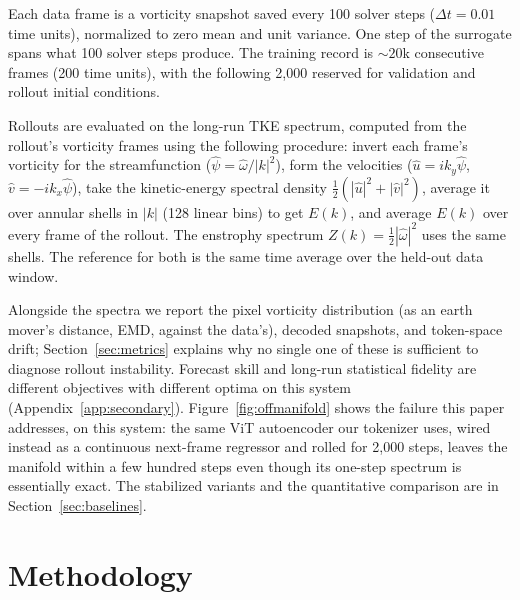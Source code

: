 \documentclass{article}
\begin{document}
Each data frame is a vorticity snapshot saved every 100 solver steps ($\Delta t = 0.01$ time units), normalized to zero mean and unit variance. One step
of the surrogate spans what 100 solver steps produce. The training record is ${\sim}20$k consecutive frames (200 time units), with the following 2{,}000 reserved for validation
and rollout initial conditions.


Rollouts are evaluated on the long-run TKE spectrum, computed from the rollout's vorticity frames using the following procedure: invert each frame's vorticity for the streamfunction
($\hat{\psi} = \hat{\omega}/|k|^2$), form the velocities
($\hat{u} = i k_y \hat{\psi}$, $\hat{v} = -i k_x \hat{\psi}$), take the
kinetic-energy spectral density $\tfrac{1}{2}(|\hat{u}|^2 + |\hat{v}|^2)$, average it
over annular shells in $|k|$ (128 linear bins) to get $E(k)$, and average $E(k)$
over every frame of the rollout. The enstrophy spectrum
$Z(k) = \tfrac{1}{2}|\hat{\omega}|^2$ uses the same shells. The reference for both is the
same time average over the held-out data window.


Alongside the spectra we report the pixel vorticity distribution (as an earth mover's
distance, EMD, against the data's), decoded snapshots, and token-space drift;
Section~\ref{sec:metrics} explains why no single one of these is sufficient to diagnose rollout instability. Forecast
skill and long-run statistical fidelity are different objectives with different
optima on this system (Appendix~\ref{app:secondary}).
Figure~\ref{fig:offmanifold} shows the failure this paper addresses, on this system:
the same ViT autoencoder our tokenizer uses, wired instead as a continuous next-frame
regressor and rolled for 2{,}000 steps, leaves the manifold within a few hundred
steps even though its one-step spectrum is essentially exact. The stabilized variants
and the quantitative comparison are in Section~\ref{sec:baselines}.


\section{Methodology}
\label{sec:method}
\label{sec:discreteroute}
\label{sec:whydiscrete}

\end{document}
